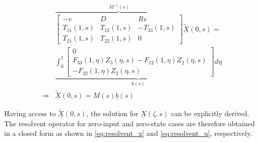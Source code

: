     \begin{equation} \label{eq:BC_AE}
    \begin{aligned}
            &\overbrace{\begin{bmatrix}
                -v & D & Rv\\
                T_{11}(1,s) & T_{12}(1,s) & -T_{33}(1,s)\\
                T_{21}(1,s) & T_{22}(1,s) & 0
            \end{bmatrix}}^{M^{-1}(s)} \underline{\tilde{X}}(0,s) =\\ 
            &\underbrace{\int_0^1 \begin{bmatrix}
                0\\ F_{33}(1, \eta) Z_3(\eta,s) - F_{12}(1, \eta) Z_2(\eta,s)\\ -F_{22}(1, \eta) Z_2(\eta,s)
            \end{bmatrix} d\eta}_{\underline{b}(s)} \\
            \Rightarrow &\underline{\tilde{X}}(0,s) = M(s) \underline{b}(s)
    \end{aligned}
    \end{equation}
    
    Having access to $\underline{\tilde{X}}(0,s)$, the solution for $\underline{X}(\zeta,s)$ can be explicitly derived. The resolvent operator for zero-input and zero-state cases are therefore obtained in a closed form as shown in \eqref{eq:resolvent_x} and \eqref{eq:resolvent_u}, respectively.
    
